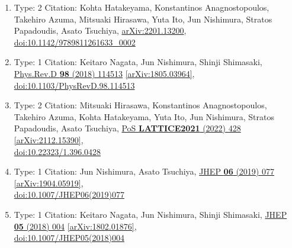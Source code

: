 \documentclass[a4paper,10pt]{article}
\begin{document}
\begin{enumerate}
\begin{enumerate}
  \item Type: 2 Citation: Kohta Hatakeyama, Konstantinos Anagnostopoulos, Takehiro Azuma, Mitsuaki Hirasawa, Yuta Ito, Jun Nishimura, Stratos Papadoudis, Asato Tsuchiya, \href{https://arxiv.org/abs/2201.13200}{arXiv:2201.13200},\\\href{https://www.doi.org/10.1142/9789811261633_0002}{doi:10.1142/9789811261633\_0002}
  \item Type: 1 Citation: Keitaro Nagata, Jun Nishimura, Shinji Shimasaki, \href{https://www.doi.org/10.1103/PhysRevD.98.114513}{Phys.Rev.D {\bf 98} (2018) 114513}  \href{https://arxiv.org/abs/1805.03964}{[arXiv:1805.03964]},\\\href{https://www.doi.org/10.1103/PhysRevD.98.114513}{doi:10.1103/PhysRevD.98.114513}
  \item Type: 2 Citation: Mitsuaki Hirasawa, Konstantinos Anagnostopoulos, Takehiro Azuma, Kohta Hatakeyama, Yuta Ito, Jun Nishimura, Stratos Papadoudis, Asato Tsuchiya, \href{https://www.doi.org/10.22323/1.396.0428}{PoS {\bf LATTICE2021} (2022) 428}  \href{https://arxiv.org/abs/2112.15390}{[arXiv:2112.15390]},\\\href{https://www.doi.org/10.22323/1.396.0428}{doi:10.22323/1.396.0428}
  \item Type: 1 Citation: Jun Nishimura, Asato Tsuchiya, \href{https://www.doi.org/10.1007/JHEP06(2019)077}{JHEP {\bf 06} (2019) 077}  \href{https://arxiv.org/abs/1904.05919}{[arXiv:1904.05919]},\\\href{https://www.doi.org/10.1007/JHEP06(2019)077}{doi:10.1007/JHEP06(2019)077}
  \item Type: 1 Citation: Keitaro Nagata, Jun Nishimura, Shinji Shimasaki, \href{https://www.doi.org/10.1007/JHEP05(2018)004}{JHEP {\bf 05} (2018) 004}  \href{https://arxiv.org/abs/1802.01876}{[arXiv:1802.01876]},\\\href{https://www.doi.org/10.1007/JHEP05(2018)004}{doi:10.1007/JHEP05(2018)004}

\end{enumerate}
\end{enumerate}
\end{document}
